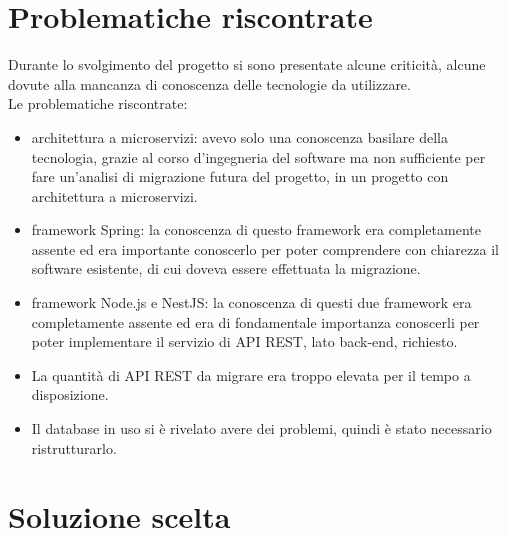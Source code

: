 \section{Problematiche riscontrate}
Durante lo svolgimento del progetto si sono presentate alcune criticità, alcune dovute alla mancanza
di conoscenza delle tecnologie da utilizzare. 
\\
Le problematiche riscontrate:

\begin{itemize}
    \item architettura a microservizi: avevo solo una conoscenza basilare
          della tecnologia, grazie al corso d'ingegneria del software ma non
          sufficiente per fare un'analisi di migrazione futura del progetto, in un progetto con 
          architettura a microservizi.
    \item framework Spring: la conoscenza di questo framework era completamente assente
        ed era importante conoscerlo per poter comprendere con chiarezza il software esistente,
        di cui doveva essere effettuata la migrazione.
    \item framework Node.js e NestJS: la conoscenza di questi due framework era completamente
        assente ed era di fondamentale importanza conoscerli per poter implementare il servizio
        di \gls{API} \gls{REST}, lato back-end, richiesto.
    \item La quantità di \gls{API} \gls{REST} da migrare era troppo elevata per il tempo a disposizione.
    \item Il database in uso si è rivelato avere dei problemi, quindi è stato necessario ristrutturarlo.
\end{itemize}

\section{Soluzione scelta}

